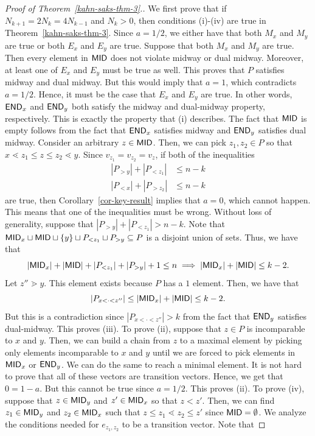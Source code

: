 \documentclass{puthesis-UG}
\begin{document}
\begin{proof}[Proof of Theorem~\ref{kahn-saks-thm-3}.]
	We first prove that if $N_{k+1} = 2N_k = 4 N_{k-1}$ and $N_k > 0$, then conditions (i)-(iv) are true in Theorem~\ref{kahn-saks-thm-3}. Since $a = 1/2$, we either have that both $M_x$ and $M_y$ are true or both $E_x$ and $E_y$ are true. Suppose that both $M_x$ and $M_y$ are true. Then every element in $\mathsf{MID}$ does not violate midway or dual midway. Moreover, at least one of $E_x$ and $E_y$ must be true as well. This proves that $P$ satisfies midway and dual midway. But this would imply that $a = 1$, which contradicts $a = 1/2$. Hence, it must be the case that $E_x$ and $E_y$ are true. In other words, $\mathsf{END}_x$ and $\mathsf{END}_y$ both satisfy the midway and dual-midway property, respectively.  This is exactly the property that (i) describes. The fact that $\mathsf{MID}$ is empty follows from the fact that $\mathsf{END}_x$ satisfies midway and $\mathsf{END}_y$ satisfies dual midway. Consider an arbitrary $z \in \mathsf{MID}$. Then, we can pick $z_1, z_2 \in P$ so that $x \lessdot z_1 \leq z \leq z_2 \lessdot y$. Since $v_{z_1} = v_{z_2} = v_z$, if both of the inequalities
	\begin{align*}
		|P_{> y}| + |P_{< z_1}| & \leq n-k \\
		|P_{< x}| + |P_{> z_2}| & \leq n-k 
	\end{align*}
	are true, then Corollary~\ref{cor-key-result} implies that $a = 0$, which cannot happen. This means that one of the inequalities must be wrong. Without loss of generality, suppose that $|P_{> y}| + |P_{<z_1}| > n-k$. Note that $\mathsf{MID}_x \sqcup \mathsf{MID} \sqcup \{y\} \sqcup P_{< z_1} \sqcup P_{> y} \subseteq P$ is a disjoint union of sets. Thus, we have that 
	\[
		|\mathsf{MID}_x| + |\mathsf{MID}| + |P_{< z_1}| + |P_{> y}| + 1 \leq n \implies |\mathsf{MID}_x| + |\mathsf{MID}| \leq k-2.
	\]
	Let $z'' \gtrdot y$. This element exists because $P$ has a $1$ element. Then, we have that 
	\[
		|P_{x < \cdot < z''}| \leq |\mathsf{MID}_x| + |\mathsf{MID}| \leq k-2.  
	\]
	But this is a contradiction since $|P_{x < \cdot < z''}| > k$ from the fact that $\mathsf{END}_y$ satisfies dual-midway. This proves (iii). To prove (ii), suppose that $z \in P$ is incomparable to $x$ and $y$. Then, we can build a chain from $z$ to a maximal element by picking only elements incomparable to $x$ and $y$ until we are forced to pick elements in $\mathsf{MID}_x$ or $\mathsf{END}_y$. We can do the same to reach a minimal element. It is not hard to prove that all of these vectors are transition vectors. Hence, we get that $0 = 1 - a$. But this cannot be true since $a = 1/2$. This proves (ii). To prove (iv), suppose that $z \in \mathsf{MID}_y$ and $z' \in \mathsf{MID}_x$ so that $z < z'$. Then, we can find $z_1 \in \mathsf{MID}_y$ and $z_2 \in \mathsf{MID}_x$ such that $z \leq z_1 \lessdot z_2 \leq z'$ since $\mathsf{MID} = \emptyset$. We analyze the conditions needed for $e_{z_1, z_2}$ to be a transition vector. Note that 

\end{proof}
\end{document}
